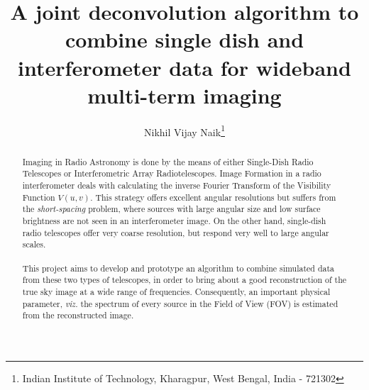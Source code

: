 \documentclass{article}
\title{A joint deconvolution algorithm to combine single dish and interferometer data for wideband multi-term imaging}
\author{Nikhil Vijay Naik\footnote{Indian Institute of Technology, Kharagpur, West Bengal, India - 721302}}
\begin{document}
\maketitle
\begin{abstract}
	Imaging in Radio Astronomy is done by the means of either Single-Dish Radio Telescopes or Interferometric Array Radiotelescopes. Image Formation in a radio interferometer deals with calculating the inverse Fourier Transform of the Visibility Function $V(u,v)$. This strategy offers excellent angular resolutions but suffers from the \textit{short-spacing} problem, where sources with large angular size and low surface brightness are not seen in an interferometer image. On the other hand, single-dish radio telescopes offer very coarse resolution, but respond very well to large angular scales. \\\\This project aims to develop and prototype an algorithm to combine simulated data from these two types of telescopes, in order to bring about a good reconstruction of the true sky image at a wide range of frequencies. Consequently, an important physical parameter, \textit{viz.} the spectrum of every source in the Field of View (FOV) is estimated from the reconstructed image.
\end{abstract}
\newpage
\tableofcontents
\newpage
\end{document}
